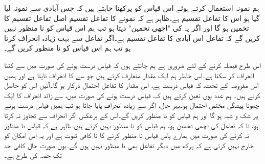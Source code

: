ہم نمونہ  استعمال کرتے ہوئے اس قیاس کو پرکھنا چاہتے ہیں کہ جس آبادی سے نمونہ لیا گیا ہو اس کا  تفاعل تقسیم  ہے۔ظاہر ہے کہ نمونے کا تفاعل تقسیم  اصل تفاعل تقسیم  کا تخمین ہو گا اور اگر یہ  کی "اچھی تخمین" دیتا ہو تب ہم اس قیاس کو نا منظور  نہیں کریں گے کہ تفاعل  اس آبادی کا تفاعل تقسیم ہے۔اگر  تفاعل  سے بہت زیادہ انحراف کرتا ہو تب ہم اس قیاس کو نا منظور کریں گے۔ 

اس طرح فیصلہ کرنے کے لئے ضروری ہے ہم جانتے ہوں کہ قیاس درست ہونے کی صورت میں  سے    کتنا انحراف کر سکتا ہے۔اس خاطر ہم ایک مقدار متعارف کرتے ہیں جو  سے  کا انحراف ناپتا ہے اور ہمیں اس مفروضہ کے تحت، کہ قیاس درست ہے، اس مقدار کا تفاعل احتمال درکار ہو گا۔آئیں اس کو حاصل کرتے ہیں۔ ہم عدد  یوں تعین کرتے ہیں کہ، قیاس درست ہونے کی صورت میں،  سے زائد انحراف کا ایک  چھوٹا پیشگی مختص احتمال ہو۔بہر حال، اگر  سے زیادہ انحراف پایا جاتا ہو تب ہمیں قیاس درست ہونے پر شک و شبہ ہو گا اور ہم قیاس کو نا منظور کریں گے۔اس کے برعکس اگر انحراف  سے تجاوز نہ کرتا ہو، تا کہ  تفاعل  کی اچھی تخمین ہو، ہم قیاس کو نا منظور نہیں کرتے ہیں۔ظاہر ہے کہ قیاس نا منظور نہ کرنے کی صورت میں ہمارے پاس قیاس نا منظور کرنے کا نا کافی ثبوت ہے اور یہ اس امکان کو خارج نہیں کرتی ہے کہ پرکھ میں دیگر تفاعل بھی نا منظور نہیں ہوں گے۔یوں صورت حال کافی حد تک  حصہ  کی طرح ہے۔ 

